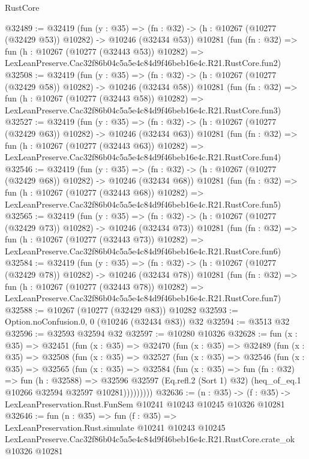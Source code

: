 \begin{lexlean}{RustCore}
\begin{coremodule}
@32489 := @32419
    (fun (y : @35) =>
    (fn : @32) -> (h : @10267 (@10277 (@32429 @53)) @10282) -> @10246 (@32434 @53))
    @10281
    (fun (fn : @32) =>
    fun (h : @10267 (@10277 (@32443 @53)) @10282) =>
    LexLeanPreserve.Cac32f86b04c5a5e4c84d9f46beb16e4c.R21.RustCore.fun2)
@32508 := @32419
    (fun (y : @35) =>
    (fn : @32) -> (h : @10267 (@10277 (@32429 @58)) @10282) -> @10246 (@32434 @58))
    @10281
    (fun (fn : @32) =>
    fun (h : @10267 (@10277 (@32443 @58)) @10282) =>
    LexLeanPreserve.Cac32f86b04c5a5e4c84d9f46beb16e4c.R21.RustCore.fun3)
@32527 := @32419
    (fun (y : @35) =>
    (fn : @32) -> (h : @10267 (@10277 (@32429 @63)) @10282) -> @10246 (@32434 @63))
    @10281
    (fun (fn : @32) =>
    fun (h : @10267 (@10277 (@32443 @63)) @10282) =>
    LexLeanPreserve.Cac32f86b04c5a5e4c84d9f46beb16e4c.R21.RustCore.fun4)
@32546 := @32419
    (fun (y : @35) =>
    (fn : @32) -> (h : @10267 (@10277 (@32429 @68)) @10282) -> @10246 (@32434 @68))
    @10281
    (fun (fn : @32) =>
    fun (h : @10267 (@10277 (@32443 @68)) @10282) =>
    LexLeanPreserve.Cac32f86b04c5a5e4c84d9f46beb16e4c.R21.RustCore.fun5)
@32565 := @32419
    (fun (y : @35) =>
    (fn : @32) -> (h : @10267 (@10277 (@32429 @73)) @10282) -> @10246 (@32434 @73))
    @10281
    (fun (fn : @32) =>
    fun (h : @10267 (@10277 (@32443 @73)) @10282) =>
    LexLeanPreserve.Cac32f86b04c5a5e4c84d9f46beb16e4c.R21.RustCore.fun6)
@32584 := @32419
    (fun (y : @35) =>
    (fn : @32) -> (h : @10267 (@10277 (@32429 @78)) @10282) -> @10246 (@32434 @78))
    @10281
    (fun (fn : @32) =>
    fun (h : @10267 (@10277 (@32443 @78)) @10282) =>
    LexLeanPreserve.Cac32f86b04c5a5e4c84d9f46beb16e4c.R21.RustCore.fun7)
@32588 := @10267 (@10277 (@32429 @83)) @10282
@32593 := Option.noConfusion.{0, 0} (@10246 (@32434 @83)) @32
@32594 := @3513 @32
@32596 := @32593 @32594 @32
@32597 := @10280 @10326
@32628 := fun (x : @35) =>
  @32451
    (fun (x : @35) =>
    @32470
      (fun (x : @35) =>
      @32489
        (fun (x : @35) =>
        @32508
          (fun (x : @35) =>
          @32527
            (fun (x : @35) =>
            @32546
              (fun (x : @35) =>
              @32565
                (fun (x : @35) =>
                @32584
                  (fun (x : @35) =>
                  fun (fn : @32) =>
                  fun (h : @32588) =>
                  @32596
                    @32597
                    (Eq.refl.{2} (Sort 1) @32)
                    (heq_of_eq.{1} @10266 @32594 @32597 @10281)))))))))
@32636 := (n : @35) ->
  (f : @35) -> LexLeanPreservation.Rust.FunSem @10241 @10243 @10245 @10326 @10281
@32646 := fun (n : @35) =>
  fun (f : @35) =>
  LexLeanPreservation.Rust.simulate
    @10241
    @10243
    @10245
    LexLeanPreserve.Cac32f86b04c5a5e4c84d9f46beb16e4c.R21.RustCore.crate_ok
    @10326
    @10281
\end{coremodule}
\end{lexlean}
